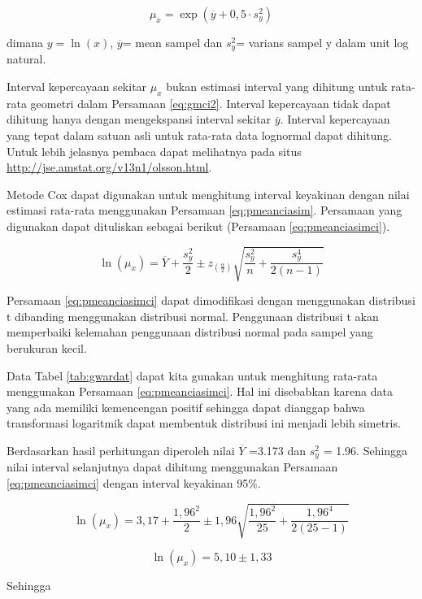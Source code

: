 \documentclass[]{book}
\begin{document}
\begin{equation}
  \mu_x=\exp\left(\overline{y}+0,5\cdot s_y^2\right)
  \label{eq:pmeanciasim}
\end{equation}

dimana \(y=\ln{(x)}\), \(\overline{y}\)= mean sampel dan \(s^2_y\)=
varians sampel y dalam unit log natural.

Interval kepercayaan sekitar \(\mu_x\) bukan estimasi interval yang
dihitung untuk rata-rata geometri dalam Persamaan \eqref{eq:gmci2}.
Interval kepercayaan tidak dapat dihitung hanya dengan mengekspansi
interval sekitar \(\overline{y}\). Interval kepercayaan yang tepat dalam
satuan asli untuk rata-rata data lognormal dapat dihitung. Untuk lebih
jelasnya pembaca dapat melihatnya pada situs
\url{http://jse.amstat.org/v13n1/olsson.html}.

Metode Cox dapat digunakan untuk menghitung interval keyakinan dengan
nilai estimasi rata-rata menggunakan Persamaan \eqref{eq:pmeanciasim}.
Persamaan yang digunakan dapat dituliskan sebagai berikut (Persamaan
\eqref{eq:pmeanciasimci}).

\begin{equation}
  \ln\left(\mu_x\right)=\overline{Y}+\frac{s_y^2}{2}\pm z_{\left(\frac{\alpha}{2}\right)}\sqrt{\frac{s_y^2}{n}+\frac{s_y^4}{2\left(n-1\right)}}
  \label{eq:pmeanciasimci}
\end{equation}

Persamaan \eqref{eq:pmeanciasimci} dapat dimodifikasi dengan menggunakan
distribusi t dibanding menggunakan distribusi normal. Penggunaan
distribusi t akan memperbaiki kelemahan penggunaan distribusi normal
pada sampel yang berukuran kecil.

Data Tabel \ref{tab:gwardat} dapat kita gunakan untuk menghitung
rata-rata menggunakan Persamaan \eqref{eq:pmeanciasimci}. Hal ini
disebabkan karena data yang ada memiliki kemencengan positif sehingga
dapat dianggap bahwa transformasi logaritmik dapat membentuk distribusi
ini menjadi lebih simetris.

Berdasarkan hasil perhitungan diperoleh nilai \(\overline{Y}\) =3.173
dan \(s^2_y\) = 1.96. Sehingga nilai interval selanjutnya dapat dihitung
menggunakan Persamaan \eqref{eq:pmeanciasimci} dengan interval keyakinan
95\%.

\[
  \ln\left(\mu_x\right)=3,17+\frac{1,96^2}{2}\pm1,96\sqrt{\frac{1,96^2}{25}+\frac{1,96^4}{2\left(25-1\right)}}
\]

\[
  \ln\left(\mu_x\right)=5,10\pm1,33
\]

Sehingga
\end{document}
